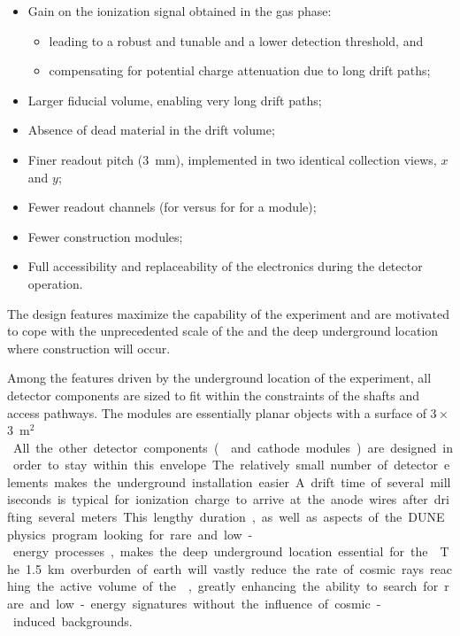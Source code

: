 \begin{itemize}
\item Gain on the ionization signal obtained in the gas phase:
\begin{itemize}
\item  leading to a robust and tunable  and a lower detection threshold, and
\item  compensating for potential charge attenuation due to long drift paths; 
\end{itemize}
\item  Larger fiducial volume, enabling very long drift paths;
\item  Absence of dead material in the \lar drift volume;
\item  Finer readout pitch (\SI{3}{mm}), implemented in two identical collection views, $x$ and $y$;
\item  Fewer readout channels (\dpnumcrpch for \dual versus \spnumch for \single for a  \nominalmodsize module); 
\item  Fewer construction modules;
\item  Full accessibility and replaceability of the  electronics during the detector operation.

\end{itemize}

 The \dual design features maximize the capability of the experiment and are motivated to cope with the unprecedented scale of the  and the deep underground location where construction will occur.

Among the features driven by the underground location of the experiment, all detector components are sized to fit within the constraints of the \surf shafts and access pathways. The  modules are essentially planar objects with a surface of \num{3}\,$\times$\,\SI{3}{m$^2$}. All the other detector %
components ( and cathode modules) are %
designed in order to stay within this envelope. The relatively small number of detector elements makes the underground installation easier.

A drift time of several milliseconds is typical for ionization charge to arrive at the anode wires after drifting several meters.  This lengthy duration, as well as aspects of the DUNE physics program looking for rare and low-energy processes, makes the deep underground location essential for the .  The \SI{1.5}{km} overburden of earth will vastly reduce the rate of cosmic rays reaching the active volume of the , greatly enhancing the ability to search for rare and low-energy signatures without the influence of cosmic-induced backgrounds.  

